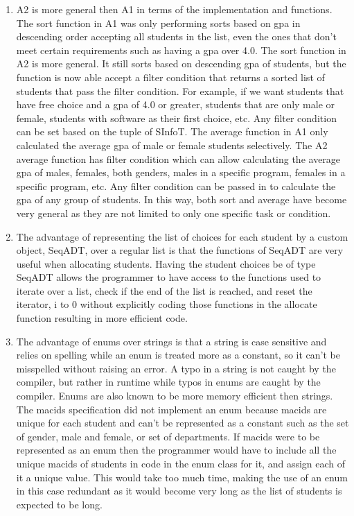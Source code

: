 \documentclass[12pt]{article}
\begin{document}
\begin{enumerate}
\item A2 is more general then A1 in terms of the implementation and functions. The sort function in A1 was only performing sorts based on gpa in descending order accepting all students in the list, even the 
ones that don't meet certain requirements such as having a gpa over 4.0. The sort function in A2 is more general. It still sorts based on descending gpa of students, but the function is now able accept a filter
condition that returns a sorted list of students that pass the filter condition. For example, if we want students that have free choice and a gpa of 4.0 or greater, students that are only male or female, students with 
software as their first choice, etc. Any filter condition can be set based on the tuple of SInfoT. The average function in A1 only calculated the average gpa of male or female students selectively. The A2 average function
has filter condition which can allow calculating the average gpa of males, females, both genders, males in a specific program, females in a specific program, etc. Any filter condition can be passed in to calculate the gpa of 
any group of students. In this way, both sort and average have become very general as they are not limited to only one specific task or condition.

\item The advantage of representing the list of choices for each student by a custom object, SeqADT, over a regular list is that the functions of SeqADT
are very useful when allocating students. Having the student choices be of type SeqADT allows the programmer to have access to the functions used to iterate over a list, 
check if the end of the list is reached, and reset the iterator, i to 0 without explicitly coding those functions in the allocate function resulting in more efficient code.


\item The advantage of enums over strings is that a string is case sensitive and relies on spelling while an enum is treated more as a constant, so it can't be misspelled without raising an error. A
typo in a string is not caught by the compiler, but rather in runtime while typos in enums are caught by the compiler. Enums are also known to be more memory efficient then strings. 
The macids specification did not implement an enum because macids are unique for each student and can't be represented as a constant such as the set of gender, male and female, or set of departments.
If macids were to be represented as an enum then the programmer would have to include all the unique macids of students in code in the enum class for it, and assign each of it a unique value. This would
take too much time, making the use of an enum in this case redundant as it would become very long as the list of students is expected to be long.
\end{enumerate}
\end{document}
